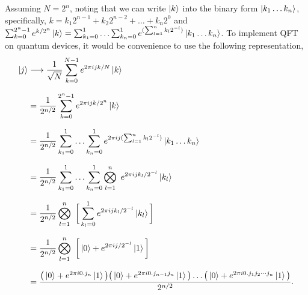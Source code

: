 \documentclass[a4paper]{article}
\begin{document}
Assuming $N = 2^n$, noting that we can write $\ket{k}$ into the binary form 
$\ket{k_1 \dotso k_n}$, specifically, $k = k_1 2^{n-1} + k_2 2^{n-2} + \dotso + k_n 2^0$ 
and 
$\sum_{k = 0}^{2^n-1} e^{k/2^n} \ket{k} = \sum_{k_1 = 0}^{1} \dotso \sum_{k_n = 0}^{1} e^{(\sum_{l = 1}^{n} k_l 2^{-l})} \ket{k_1 \dotso k_n}$. 
To implement QFT on quantum devices, it would be convenience to use the following representation,
    \begin{equation} \label{eq:eq3}
    \setlength{\jot}{10pt}
    \begin{aligned}
        \ket{j} &\longrightarrow \frac{1}{\sqrt{N}} \sum_{k=0}^{N-1} e^{2 \pi i j k / N} \ket{k} \\
            &= \frac{1}{2^{n/2}}   \sum_{k=0}^{2^n-1}   e^{2 \pi i j k / 2^n}   \ket{k} \\
            &= \frac{1}{2^{n/2}}    \sum_{k_1 = 0}^{1} \dotso \sum_{k_n = 0}^{1}   e^{2 \pi i j (\sum_{l=1}^{n} k_l 2^{-l})}   \ket{k_1 \dotso k_n} \\
            &= \frac{1}{2^{n/2}}    \sum_{k_1 = 0}^{1} \dotso \sum_{k_n = 0}^{1}   \bigotimes_{l = 1}^{n} \   e^{2 \pi i j k_l / 2^{-l}}   \ket{k_l} \\
            &= \frac{1}{2^{n/2}}    \bigotimes_{l = 1}^{n} \   \bigg[ \sum_{k_l = 0}^{1}   e^{2 \pi i j k_l / 2^{-l}}   \ket{k_l} \bigg] \\
            &= \frac{1}{2^{n/2}}    \bigotimes_{l = 1}^{n} \   \bigg[ \ket{0} + e^{2 \pi i j / 2^{-l}} \ket{1} \bigg] \\
            &= \frac { \big( \ket{0} + e^{2 \pi i 0.j_n} \ket{1} \big)   \big( \ket{0} + e^{2 \pi i 0.j_{n-1} j_n} \ket{1} \big)   \dotso   \big( \ket{0} + e^{2 \pi i 0.j_1 j_2 \cdots j_n} \ket{1} \big) } {2^{n/2}}.
    \end{aligned}
    \end{equation}
\end{document}
